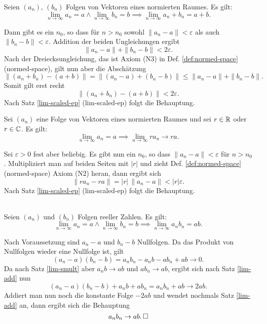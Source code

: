 \begin{Satz}\label{lim-add}
Seien $(a_n)$, $(b_n)$ Folgen von Vektoren eines normierten Raumes.
Es gilt:
\[\lim_{n\to\infty} a_n = a\land \lim_{n\to\infty} b_n
= b \implies \lim_{n\to\infty} a_n+b_n = a+b.\]
\end{Satz}

\begin{Beweis}
Dann gibt es ein $n_0$, so dass für $n>n_0$ sowohl
$\|a_n-a\|<\varepsilon$ als auch $\|b_n-b\|<\varepsilon$.
Addition der beiden Ungleichungen ergibt
\[\|a_n-a\| + \|b_n-b\| < 2\varepsilon.\]
Nach der Dreiecksungleichung, das ist Axiom (N3) in Def.
\ref{def:normed-space} (normed-space), gilt nun aber die Abschätzung
\[\|(a_n+b_n)-(a+b)\| = \|(a_n-a)+(b_n-b)\| \le \|a_n-a\|+\|b_n-b\|.\]
Somit gilt erst recht
\[\|(a_n+b_n)-(a+b)\| < 2\varepsilon.\]
Nach Satz \ref{lim-scaled-ep} (lim-scaled-ep)
folgt die Behauptung.\,\qedsymbol
\end{Beweis}

\begin{Satz}\label{lim-smult}
Sei $(a_n)$ eine Folge von Vektoren eines normierten Raumes
und sei $r\in\mathbb R$ oder $r\in\mathbb C$. Es gilt:
\[\lim_{n\to\infty} a_n = a\implies \lim_{n\to\infty} ra_n\to ra.\]
\end{Satz}

\begin{Beweis}
Sei $\varepsilon>0$ fest aber beliebig. Es gibt nun ein $n_0$, so
dass $\|a_n-a\|<\varepsilon$ für $n>n_0$. Multipliziert man auf beiden Seiten
mit $|r|$ und zieht Def. \ref{def:normed-space} (normed-space)
Axiom (N2) heran, dann ergibt sich
\[\|ra_n-ra\| = |r|\,\|a_n-a\|<|r|\varepsilon.\]
Nach Satz \ref{lim-scaled-ep} (lim-scaled-ep)
folgt die Behauptung.\,\qedsymbol
\end{Beweis}

\begin{Satz}\mbox{}\\
Seien $(a_n)$ und $(b_n)$ Folgen
reeller Zahlen. Es gilt:
\[\lim_{n\to\infty} a_n=a\land\lim_{n\to\infty} b_n=b\implies
\lim_{n\to\infty} a_n b_n = ab.\]
\end{Satz}

\begin{Beweis}
Nach Voraussetzung sind $a_n-a$ und $b_n-b$ Nullfolgen.
Da das Produkt von Nullfolgen wieder eine Nullfolge ist, gilt
\[(a_n-a)(b_n-b) = a_n b_n-a_n b-ab_n+ab\to 0.\]
Da nach Satz \ref{lim-smult} aber $a_n b\to ab$ und $ab_n\to ab$,
ergibt sich nach Satz \ref{lim-add} nun
\[(a_n-a)(b_n-b)+a_n b+ab_n = a_n b_n+ab\to 2ab.\]
Addiert man nun noch die konstante Folge $-2ab$
und wendet nochmals Satz \ref{lim-add} an, dann ergibt sich
die Behauptung
\[a_n b_n\to ab.\,\square\]
\end{Beweis}

